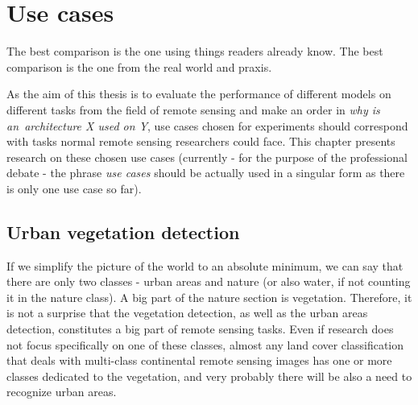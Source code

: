 \chapter{Use cases}
\label{use-cases}

The best comparison is the one using things readers already know. The best comparison is the one from the real world and praxis.

As the aim of this thesis is to evaluate the performance of different  models on different tasks from the field of remote sensing and make an order in \textit{why is an~architecture X used on Y}, use cases chosen for experiments should correspond with tasks normal remote sensing researchers could face. This chapter presents research on these chosen use cases (currently - for the purpose of the professional debate - the phrase \textit{use cases} should be actually used in a singular form as there is only one use case so far).

\section{Urban vegetation detection}
\label{urban-green}

If we simplify the picture of the world to an absolute minimum, we can say that there are only two classes - urban areas and nature (or also water, if not counting it in the nature class). A big part of the nature section is vegetation. Therefore, it is not a surprise that the vegetation detection, as well as the urban areas detection, constitutes a big part of remote sensing tasks. Even if research does not focus specifically on one of these classes, almost any land cover classification that deals with multi-class continental remote sensing images has one or more classes dedicated to the vegetation, and very probably there will be also a need to recognize urban areas.


